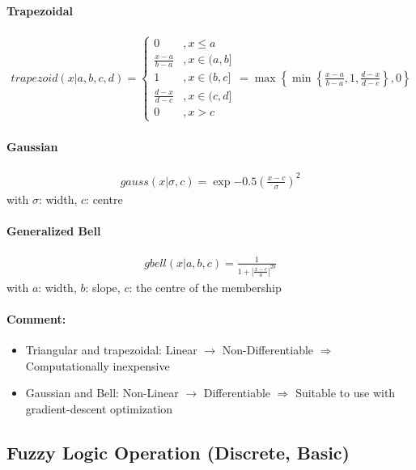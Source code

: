 \documentclass{tron}
\begin{document}
\paragraph{Trapezoidal}
 	\begin{align}
		trapezoid(x| a, b, c, d)	 = 
		\begin{cases}
			0 &, x \leq a \\
			\frac{x-a}{b-a} &, x \in (a, b] \\
			1 &, x\in (b, c] \\
			\frac{d-x}{d-c} &, x \in (c, d] \\
			0 &, x > c
		\end{cases}
		= \max \left\{ \min \left\{  \frac{x-a}{b-a}, 1, \frac{d-x}{d-c} \right\}, 0 \right\}
	\end{align}
\paragraph{Gaussian}
	\begin{align}
		gauss(x | \sigma, c) = \exp{-0.5 (\frac{x-c}\sigma)^2}
	\end{align}
	with $\sigma$: width, $c$: centre
\paragraph{Generalized Bell}
	\begin{align}
		gbell(x|a,b,c) = \frac{1}{1 + |\frac{x-c}{a}|^{2b}}
	\end{align}
	with $a$: width, $b$: slope, $c$: the centre of the membership
\paragraph{Comment:}
\begin{remark}{}
	\begin{itemize}
		\item Triangular and trapezoidal: Linear $\rightarrow$ Non-Differentiable $\Rightarrow$ Computationally inexpensive
		\item Gaussian and Bell: Non-Linear $\rightarrow$ Differentiable $\Rightarrow$ Suitable to use with gradient-descent optimization
	\end{itemize}	
\end{remark}

\clearpage
\subsection{Fuzzy Logic Operation (Discrete, Basic)}
\end{document}
